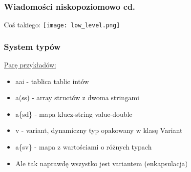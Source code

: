\begin{frame}
    \frametitle{Wiadomości niskopoziomowo cd.}
    Coś takiego:
    \texttt{[image: low\_level.png]}
\end{frame}

\begin{frame}
    \frametitle{System typów}
    \href{https://dbus.freedesktop.org/doc/dbus-specification.html}{Parę przykładów:}
    \begin{itemize}
        \item aai - tablica tablic intów \pause
        \item a(ss) - array structów z dwoma stringami \pause
        \item a\{sd\} - mapa klucz-string value-double \pause
        \item v - variant, dynamiczny typ opakowany w klasę Variant \pause
        \item a\{sv\} - mapa z wartościami o różnych typach \pause
        \item Ale tak naprawdę wszystko jest variantem (enkapsulacja)
    \end{itemize}
\end{frame}





